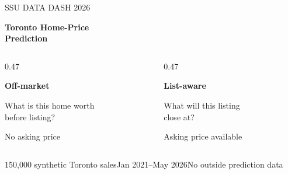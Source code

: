 \documentclass[aspectratio=169,20pt]{beamer}
\newcommand{\smalltext}{\fontsize{15}{19}\selectfont}
\newcommand{\eyebrow}[1]{{\fontsize{14}{17}\selectfont\color{Muted}\MakeUppercase{#1}}}
\begin{document}
\begin{frame}[t]
\vspace{5mm}
\eyebrow{SSU Data Dash 2026}\par
\vspace{6mm}

{\fontsize{43}{49}\selectfont\bfseries Toronto Home-Price\\Prediction\par}\par
\vspace{11mm}
\begin{columns}[T,onlytextwidth]
\begin{column}{0.47\textwidth}
{\fontsize{27}{32}\selectfont\color{Blue}\bfseries Off-market\par}\par
\vspace{3mm}
What is this home worth\\before listing?

\smalltext No asking price
\end{column}
\begin{column}{0.47\textwidth}
{\fontsize{27}{32}\selectfont\color{Teal}\bfseries List-aware\par}\par
\vspace{3mm}
What will this listing\\close at?

\smalltext Asking price available
\end{column}
\end{columns}
\vfill
{\smalltext\color{Muted}150,000 synthetic Toronto sales\quad\textbullet\quad Jan 2021--May 2026\quad\textbullet\quad No outside prediction data}
\end{frame}
\end{document}

